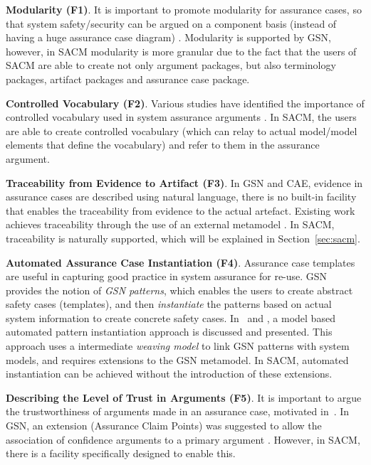 \textbf{Modularity (F1)}. It is important to promote modularity for assurance cases, so that system safety/security can be argued on a component basis (instead of having a huge assurance case diagram) \cite{despotou2008investigating}. 
Modularity is supported by GSN, however, in SACM modularity is more granular due to the fact that the users of SACM are able to create not only argument packages, but also terminology packages, artifact packages and assurance case package.


\textbf{Controlled Vocabulary (F2)}. Various studies have identified the importance of controlled vocabulary used in system assurance arguments \cite{luo2015safety, attwood2014use}. 
In SACM, the users are able to create controlled vocabulary (which can relay to actual model/model elements that define the vocabulary) and refer to them in the assurance argument. 

\textbf{Traceability from Evidence to Artifact (F3)}. In GSN and CAE, evidence in assurance cases are described using natural language, there is no built-in facility that enables the traceability from evidence to the actual artefact. 
Existing work achieves traceability through the use of an external metamodel \cite{taguchi2014linking}.
In SACM, traceability is naturally supported, which will be explained in Section~\ref{sec:sacm}.

\textbf{Automated Assurance Case Instantiation (F4)}. Assurance case templates are useful in capturing good practice in system assurance for re-use.
GSN provides the notion of \textit{GSN patterns}, which enables the users to create abstract safety cases (templates), and then \textit{instantiate} the patterns based on actual system information to create concrete safety cases. 
In~\cite{hawkins2015need} and \cite{hawkins2015weaving}, a model based automated pattern instantiation approach is discussed and presented. 
This approach uses a intermediate \textit{weaving model} to link GSN patterns with system models, and requires extensions to the GSN metamodel. 
In SACM, automated instantiation can be achieved without the introduction of these extensions. 

\textbf{Describing the Level of Trust in Arguments (F5)}. It is important to argue the trustworthiness of arguments made in an assurance case, motivated in~\cite{hawkins2011new}. 
In GSN, an extension (Assurance Claim Points) was suggested to allow the association of confidence arguments to a primary argument \cite{hawkins2011new}.  
However, in SACM, there is a facility specifically designed to enable this.


